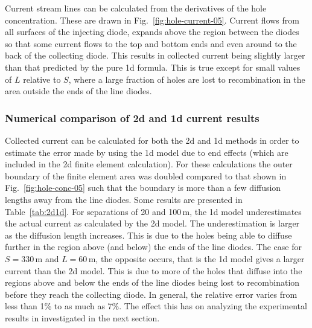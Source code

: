 Current stream lines can be calculated from the derivatives of the
hole concentration.  These are drawn in Fig.~\ref{fig:hole-current-05}.
Current flows from all surfaces of the injecting diode, expands above
the region between the diodes so that  some current
flows to the top and bottom ends and even around to the back of the
 collecting diode.  This results in collected current being slightly
larger than that predicted by the pure 1d formula.  This is true
except for small values of $L$ relative to $S$,
 where a large fraction of holes are lost
to recombination in the area outside the ends of the line diodes.


   \subsubsection{Numerical comparison of 2d and 1d current results}

Collected current can be calculated for both the 2d and 1d methods in order to
estimate the error made by using the 1d model due to end effects (which are included
in the 2d finite element calculation).  For these calculations the outer boundary
of the finite element area was doubled compared to that shown in
Fig.~\ref{fig:hole-conc-05} such that the boundary is more than a few
diffusion lengths away from the line diodes. 
 Some results are presented in Table~\ref{tab:2d1d}.
For separations of 20 and 100\,\textmu m, the 1d model
 underestimates the actual current as calculated by the 2d model.
  The underestimation is larger as the diffusion length
increases.  This is due to the holes being able to diffuse further in the region above
(and below) the ends of the line diodes.
The case for $S=330$\,\textmu m and $L=60$\,\textmu m, the opposite occurs, that is 
the 1d model gives a larger current than the 2d model.  This is due to more of the
holes that diffuse into the regions above and below the ends of the line diodes
being lost to recombination before they reach the collecting diode.
In general, the relative error varies from less than 1\% to as much as
7\%.   The effect this has on analyzing the experimental results in investigated
in the next section.

